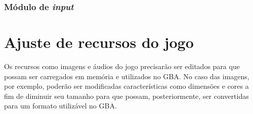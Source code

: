   \subsubsection{Módulo de \textit{input}}




\section{Ajuste de recursos do jogo}

  Os recursos como imagens e áudios do jogo precisarão ser editados para que possam ser carregados em memória e utilizados no GBA. No caso das imagens, por exemplo, poderão ser modificadas características como dimensões e cores a fim de diminuir seu tamanho para que possam, posteriormente, ser convertidas para um formato utilizável no GBA.
